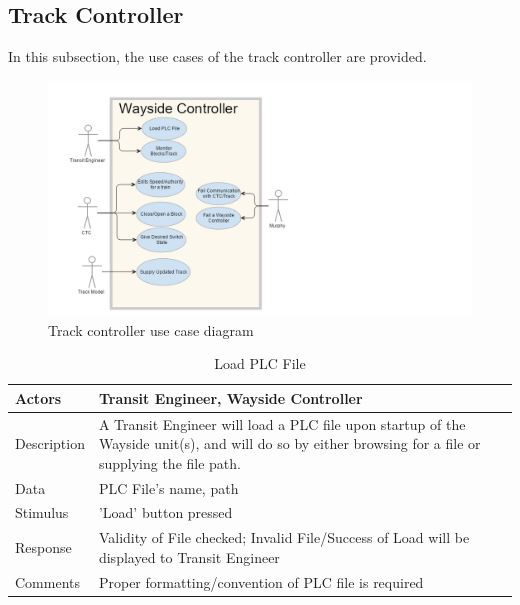 \documentclass[]{article}
\begin{document}
\subsection{Track Controller}
In this subsection, the use cases of the track controller are provided.

\begin{figure}[H]
	\centering
	\includegraphics[scale=.5]{trackcontrollerusecase.png}
	\caption{Track controller use case diagram}
\end{figure}
\begin{table}[H]
	\centering
	\caption{Load PLC File}
	\begin{tabular}{|l|l|}
		\hline
		Actors & \parbox[t]{10cm}{Transit Engineer, Wayside Controller} \\ \hline
		Description & \parbox[t]{10cm}{A Transit Engineer will load a PLC file upon startup of the Wayside unit(s), and will do so by either browsing for a file or supplying the file path.} \\ \hline
		Data &  \parbox[t]{10cm}{PLC File's name, path} \\ \hline
		Stimulus &  \parbox[t]{10cm}{ 'Load' button pressed} \\ \hline
		Response & \parbox[t]{10cm}{Validity of File checked; Invalid File/Success of Load will be displayed to Transit Engineer}\\ \hline
		Comments & \parbox[t]{10cm}{Proper formatting/convention of PLC file is required	}  \\ \hline
	\end{tabular}
\end{table}
\end{document}
